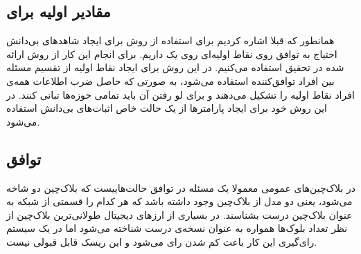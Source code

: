 \subsection{مقادیر اولیه  برای }
همانطور که قبلا اشاره کردیم برای استفاده از روش  برای ایجاد‌ شاهد‌های بی‌دانش احتیاج به توافق روی نقاط اولیه‌ای روی یک  داریم. برای انجام این کار از روش ارائه شده در تحقیق 
\cite{multipartyparams}
استفاده می‌کنیم. در این روش برای ایجاد نقاط اولیه از تقسیم مسئله‌ بین افراد توافق‌کننده استفاده می‌شود، به صورتی که حاصل ضرب اطلاعات همه‌ی افراد نقاط اولیه را تشکیل می‌دهند و برای لو رفتن آن باید تمامی حوزه‌ها تبانی کنند. در این روش خود برای ایجاد پارامترها از یک حالت خاص اثبات‌های بی‌دانش استفاده می‌شود. 
\subsection{توافق}
 در بلاک‌چین‌های عمومی معمولا یک مسئله‌ در توافق حالت‌هاییست که بلاک‌چین دو شاخه می‌شود، یعنی دو مدل از بلاک‌چین وجود داشته باشد که هر کدام را قسمتی از شبکه به عنوان بلاک‌چین درست بشناسند. در بسیاری از ارزهای دیجیتال طولانی‌ترین بلاک‌چین از نظر تعداد بلوک‌ها همواره به عنوان نسخه‌ی درست شناخته می‌شود اما در یک سیستم رای‌گیری این کار باعث کم شدن رای‌‌ می‌شود و این ریسک قابل قبولی نیست. 
 
